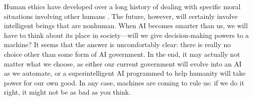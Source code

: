 \documentclass[12pt]{article}
\begin{document}
Human ethics have developed over a long history of dealing with specific moral situations involving other humans \cite{macintyre2003short}. The future, however, will certainly involve intelligent beings that are nonhuman. When AI becomes smarter than us, we will have to think about its place in society---will we give decision-making powers to a machine? It seems that the answer is uncomfortably clear: there is really no choice other than some form of AI government. In the end, it may actually not matter what we choose, as either our current government will evolve into an AI as we automate, or a superintelligent AI programmed to help humanity will take power for our own good. In any case, machines are coming to rule us: if we do it right, it might not be as bad as you think.












\end{document}
